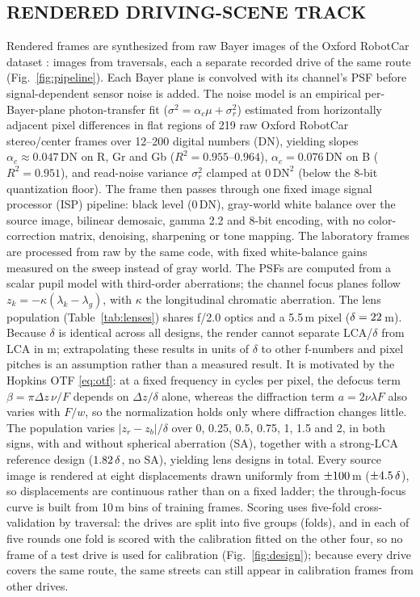 \documentclass{ieee-ojvt}
\begin{document}
\subsection{RENDERED DRIVING-SCENE TRACK}
Rendered frames are synthesized from raw Bayer images of the Oxford RobotCar dataset \cite{maddern2017robotcar}: \MthreeNplates{} images from \MthreeNtraversals{} traversals, each a separate recorded drive of the same route (Fig.~\ref{fig:pipeline}). Each Bayer plane is convolved with its channel's PSF before signal-dependent sensor noise is added. The noise model is an empirical per-Bayer-plane photon-transfer fit ($\sigma^2 = \alpha_c\mu + \sigma_r^2$) estimated from horizontally adjacent pixel differences in flat regions of 219 raw Oxford RobotCar stereo/center frames over 12--200 digital numbers (DN), yielding slopes $\alpha_c\approx 0.047$\,DN on R, Gr and Gb ($R^2 = 0.955$--$0.964$), $\alpha_c = 0.076$\,DN on B ($R^2 = 0.951$), and read-noise variance $\sigma_r^2$ clamped at $0\,\mathrm{DN}^2$ (below the 8-bit quantization floor). The frame then passes through one fixed image signal processor (ISP) pipeline: black level ($0$\,DN), gray-world white balance \cite{buchsbaum1980spatial} over the source image, bilinear demosaic, gamma 2.2 and 8-bit encoding, with no color-correction matrix, denoising, sharpening or tone mapping. The laboratory frames are processed from raw by the same code, with fixed white-balance gains measured on the sweep instead of gray world. The PSFs are computed from a scalar pupil model with third-order aberrations; the channel focus planes follow $z_k=-\kappa(\lambda_k-\lambda_g)$, with $\kappa$ the longitudinal chromatic aberration. The lens population (Table~\ref{tab:lenses}) shares f/2.0 optics and a 5.5\,\textmu m pixel ($\delta=22$\,\textmu m). Because $\delta$ is identical across all designs, the render cannot separate LCA/$\delta$ from LCA in \textmu m; extrapolating these results in units of $\delta$ to other f-numbers and pixel pitches is an assumption rather than a measured result. It is motivated by the Hopkins OTF \eqref{eq:otf}: at a fixed frequency in cycles per pixel, the defocus term $\beta=\pi\Delta z\,\nu/F$ depends on $\Delta z/\delta$ alone, whereas the diffraction term $a=2\nu\lambda F$ also varies with $F/w$, so the normalization holds only where diffraction changes little. The population varies $|z_r-z_b|/\delta$ over 0, 0.25, 0.5, 0.75, 1, 1.5 and 2, in both signs, with and without spherical aberration (SA), together with a strong-LCA reference design ($1.82\,\delta$, no SA), yielding \MthreeNlenses{} lens designs in total. Every source image is rendered at eight displacements drawn uniformly from $\pm100$\,\textmu m ($\pm4.5\,\delta$), so displacements are continuous rather than on a fixed ladder; the through-focus curve is built from 10\,\textmu m bins of training frames. Scoring uses five-fold cross-validation by traversal: the drives are split into five groups (folds), and in each of five rounds one fold is scored with the calibration fitted on the other four, so no frame of a test drive is used for calibration (Fig.~\ref{fig:design}); because every drive covers the same route, the same streets can still appear in calibration frames from other drives.
\end{document}
